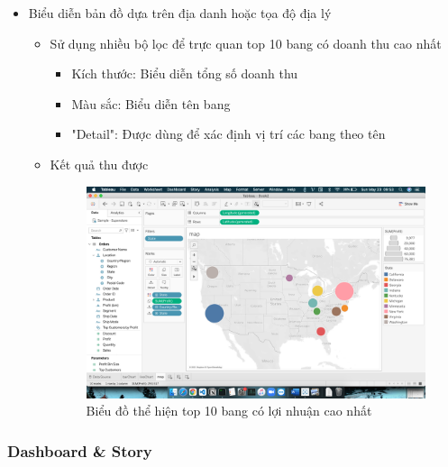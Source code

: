 \documentclass[a4paper, 12pt]{article}
\begin{document}
\begin{itemize}
    \item Biểu diễn bản đồ dựa trên địa danh hoặc tọa độ địa lý
    \begin{itemize}
        \item Sử dụng nhiều bộ lọc để trực quan top 10 bang có doanh thu cao nhất
        \begin{itemize}
            \item Kích thước: Biểu diễn tổng số doanh thu 
            \item Màu sắc: Biểu diễn tên bang 
            \item "Detail": Được dùng để xác định vị trí các bang theo tên
        \end{itemize}

        \item Kết quả thu được
        \begin{figure}[H]
            \begin{center}
                \includegraphics[scale=0.3]{img/map.png}
                \caption{Biểu đồ thể hiện top 10 bang có lợi nhuận cao nhất}
            \end{center}
        \end{figure}
    \end{itemize}
\end{itemize}

\subsubsection{Dashboard \& Story}
\end{document}

